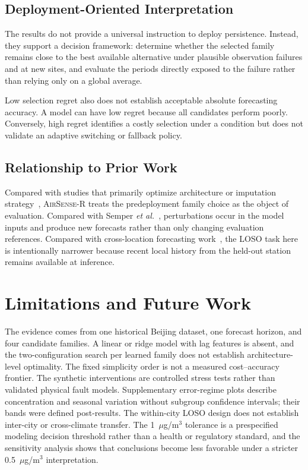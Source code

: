 \documentclass[journal]{IEEEtran}
\newcommand{\AirSense}{\textsc{AirSense-R}}
\begin{document}
\subsection{Deployment-Oriented Interpretation}
The results do not provide a universal instruction to deploy persistence. Instead, they support a decision framework: determine whether the selected family remains close to the best available alternative under plausible observation failures and at new sites, and evaluate the periods directly exposed to the failure rather than relying only on a global average.

Low selection regret also does not establish acceptable absolute forecasting accuracy. A model can have low regret because all candidates perform poorly. Conversely, high regret identifies a costly selection under a condition but does not validate an adaptive switching or fallback policy.

\subsection{Relationship to Prior Work}
Compared with studies that primarily optimize architecture or imputation strategy~\cite{chowdhury2026imputation,yagnik2026leakage}, \AirSense{} treats the predeployment family choice as the object of evaluation. Compared with Semper \emph{et al.}~\cite{semper2026dss}, perturbations occur in the model inputs and produce new forecasts rather than only changing evaluation references. Compared with cross-location forecasting work~\cite{alvaradoalcon2026citywide}, the LOSO task here is intentionally narrower because recent local history from the held-out station remains available at inference.

\section{Limitations and Future Work}
The evidence comes from one historical Beijing dataset, one forecast horizon, and four candidate families. A linear or ridge model with lag features is absent, and the two-configuration search per learned family does not establish architecture-level optimality. The fixed simplicity order is not a measured cost--accuracy frontier. The synthetic interventions are controlled stress tests rather than validated physical fault models. Supplementary error-regime plots describe concentration and seasonal variation without subgroup confidence intervals; their bands were defined post-results. The within-city LOSO design does not establish inter-city or cross-climate transfer. The 1~$\mu$g/m$^3$ tolerance is a prespecified modeling decision threshold rather than a health or regulatory standard, and the sensitivity analysis shows that conclusions become less favorable under a stricter 0.5~$\mu$g/m$^3$ interpretation.
\end{document}
